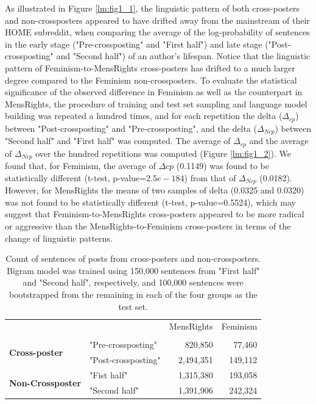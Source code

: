 \documentclass{article}
\begin{document}
As illustrated in Figure \ref{lm:fig1_1}, the linguistic pattern of both cross-posters and non-crossposters appeared to have drifted away from the mainstream of their HOME subreddit, when comparing the average of the log-probability of sentences in the early stage ("Pre-crossposting" and "First half") and late stage ("Post-crossposting" and "Second half") of an author's lifespan. Notice that the linguistic pattern of Feminism-to-MensRights cross-posters has drifted to a much larger degree compared to the Feminism non-crossposters. To evaluate the statistical significance of the observed difference in Feminism as well as the counterpart in MensRights, the procedure of training and test set sampling and language model building was repeated a hundred times, and for each repetition the delta ($\Delta_{cp}$) between "Post-crossposting" and "Pre-crossposting", and the delta ($\Delta_{Ncp}$) between "Second half" and "First half" was computed. The average of $\Delta_{cp}$ and the average of $\Delta_{Ncp}$ over the hundred repetitions was computed (Figure \ref{lm:fig1_2}). We found that, for Feminism, the average of $\Delta{cp}$ (0.1149) was found to be statistically different (t-test, p-value=$2.5e-184$) from that of $\Delta_{Ncp}$ (0.0182). However, for MensRights the means of two samples of delta (0.0325 and 0.0320) was not found to be statistically different (t-test, p-value=0.5524), which may suggest that Feminism-to-MensRights cross-posters appeared to be more radical or aggressive than the MensRights-to-Feminism cross-posters in terms of the change of linguistic patterns.




\begin{table}
    \centering
    \begin{tabular}{l l r r}\hline
        & & MensRights & Feminism\\
        & &            &         \\  
        \multirow{2}{*}{\textbf{Cross-poster}}      & "Pre-crossposting" & 820,850   & 77,460\\
                                                    & "Post-crossposting"  & 2,494,351 & 149,112\\
        \multirow{2}{*}{\textbf{Non-Crossposter}}   & "Fist half"      & 1,315,380 & 193,058\\
                                                    & "Second half"       & 1,391,906 & 242,324\\\hline
    \end{tabular}\
    \label{lm:tab1}
    \caption{Count of sentences of posts from cross-posters and non-crossposters. Bigram model was trained using 150,000 sentences from "First half" and "Second half", respectively, and 100,000 sentences were bootstrapped from the remaining in each of the four groups as the test set.}
\end{table}
\end{document}
